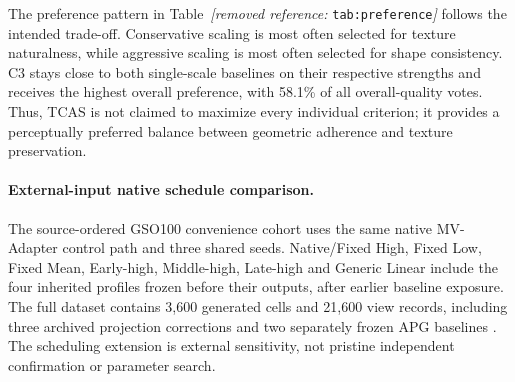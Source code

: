 \documentclass[times,twocolumn,final]{elsarticle}
\providecommand{\DIFadd}[1]{{\protect\color{blue} \sf #1}} %
\providecommand{\DIFdel}[1]{{\protect\color{red} \scriptsize #1}} %
\providecommand{\DIFaddbegin}{} %
\providecommand{\DIFaddend}{} %
\providecommand{\DIFdelbegin}{} %
\providecommand{\DIFdelend}{} %
\begin{document}
\DIFdelbegin %

\DIFdel{The preference pattern in Table~\textit{[removed reference: }\texttt{tab:preference}\textit{]} follows the intended trade-off. Conservative scaling is most often selected for texture naturalness, while aggressive scaling is most often selected for shape consistency. C3 stays close to both single-scale baselines on their respective strengths and receives the highest overall preference, with 58.1\% of all overall-quality votes. Thus, TCAS is not claimed to maximize every individual criterion; it provides a perceptually preferred balance between geometric adherence and texture preservation. }\DIFdelend \DIFaddbegin \paragraph{External-input native schedule comparison.}
\DIFadd{The source-ordered GSO100 convenience cohort uses the same native MV-Adapter control path and three shared seeds. Native/Fixed High, Fixed Low, Fixed Mean, Early-high, Middle-high, Late-high and Generic Linear include the four inherited profiles frozen before their outputs, after earlier baseline exposure. The full dataset contains 3,600 generated cells and 21,600 view records, including three archived projection corrections and two separately frozen APG baselines \cite{sad2024apg}. The scheduling extension is external sensitivity, not pristine independent confirmation or parameter search.
}\DIFaddend 
\end{document}
